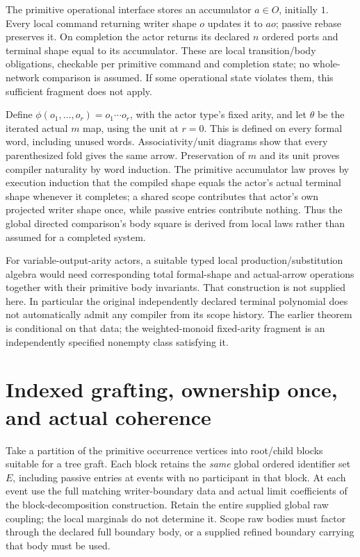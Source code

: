 \documentclass[11pt]{article}
\begin{document}
The primitive operational interface stores an accumulator $a\in O$, initially $1$. Every local command returning writer shape $o$ updates it to $ao$; passive rebase preserves it. On completion the actor returns its declared $n$ ordered ports and terminal shape equal to its accumulator. These are local transition/body obligations, checkable per primitive command and completion state; no whole-network comparison is assumed. If some operational state violates them, this sufficient fragment does not apply.

Define $\phi(o_1,\ldots,o_r)=o_1\cdots o_r$, with the actor type's fixed arity, and let $\theta$ be the iterated actual $m$ map, using the unit at $r=0$. This is defined on every formal word, including unused words. Associativity/unit diagrams show that every parenthesized fold gives the same arrow. Preservation of $m$ and its unit proves compiler naturality by word induction. The primitive accumulator law proves by execution induction that the compiled shape equals the actor's actual terminal shape whenever it completes; a shared scope contributes that actor's own projected writer shape once, while passive entries contribute nothing. Thus the global directed comparison's body square is derived from local laws rather than assumed for a completed system.

For variable-output-arity actors, a suitable typed local production/substitution algebra would need corresponding total formal-shape and actual-arrow operations together with their primitive body invariants. That construction is not supplied here. In particular the original independently declared terminal polynomial does not automatically admit any compiler from its scope history. The earlier theorem is conditional on that data; the weighted-monoid fixed-arity fragment is an independently specified nonempty class satisfying it.

\section{Indexed grafting, ownership once, and actual coherence}
Take a partition of the primitive occurrence vertices into root/child blocks suitable for a tree graft. Each block retains the \emph{same} global ordered identifier set $E$, including passive entries at events with no participant in that block. At each event use the full matching writer-boundary data and actual limit coefficients of the block-decomposition construction. Retain the entire supplied global raw coupling; the local marginals do not determine it. Scope raw bodies must factor through the declared full boundary body, or a supplied refined boundary carrying that body must be used.
\end{document}

